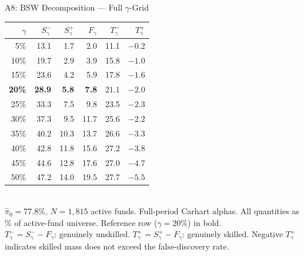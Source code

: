 \documentclass[10pt, aspectratio=169]{beamer}
\begin{document}
\begin{frame}{A8: BSW Decomposition — Full $\gamma$-Grid}
  \footnotesize
  \begin{tabular}{@{}rrrrrr@{}}
    \toprule
    $\gamma$ & $S^-_\gamma$ & $S^+_\gamma$ & $F_\gamma$ & $T^-_\gamma$ & $T^+_\gamma$ \\
    \midrule
    5\%  & 13.1 & 1.7 & 2.0 & 11.1 & $-0.2$ \\
    10\% & 19.7 & 2.9 & 3.9 & 15.8 & $-1.0$ \\
    15\% & 23.6 & 4.2 & 5.9 & 17.8 & $-1.6$ \\
    \textbf{20\%} & \textbf{28.9} & \textbf{5.8} & \textbf{7.8} & $\mathbf{21.1}$ & $\mathbf{-2.0}$ \\
    25\% & 33.3 & 7.5 & 9.8  & 23.5 & $-2.3$ \\
    30\% & 37.3 & 9.5 & 11.7 & 25.6 & $-2.2$ \\
    35\% & 40.2 & 10.3 & 13.7 & 26.6 & $-3.3$ \\
    40\% & 42.8 & 11.8 & 15.6 & 27.2 & $-3.8$ \\
    45\% & 44.6 & 12.8 & 17.6 & 27.0 & $-4.7$ \\
    50\% & 47.2 & 14.0 & 19.5 & 27.7 & $-5.5$ \\
    \bottomrule
  \end{tabular}
  \vspace{6pt}\\
  $\hat{\pi}_0 = 77.8\%$, $N=1{,}815$ active funds. Full-period Carhart alphas.
  All quantities as \% of active-fund universe. Reference row ($\gamma=20\%$) in bold.\\[4pt]
  $T^-_\gamma = S^-_\gamma - F_\gamma$: genuinely unskilled.
  $T^+_\gamma = S^+_\gamma - F_\gamma$: genuinely skilled.
  Negative $T^+_\gamma$ indicates skilled mass does not exceed the false-discovery rate.
\end{frame}

\end{document}
